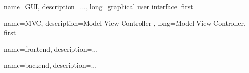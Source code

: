 


{
    name=GUI,
    description={...},%
    long={graphical user interface},
    first=
}

{
    name=MVC,
    description={Model-View-Controller %
    },
    long={Model-View-Controller},
    first=
}

{
    name=frontend,
    description={...} %
}

{
    name=backend,
    description={...} %
}